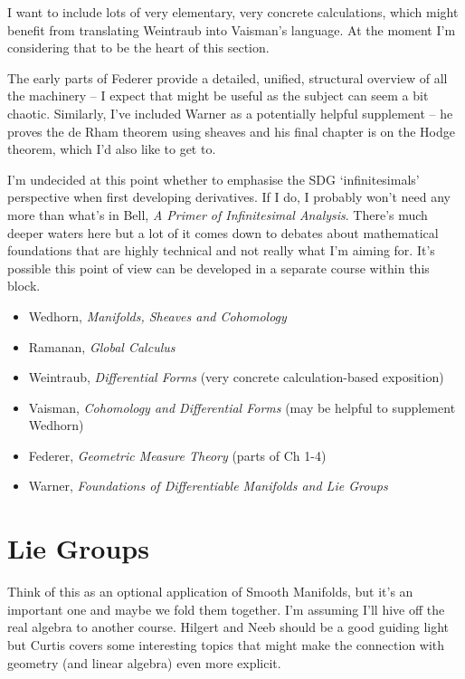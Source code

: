 \documentclass[article]{article}
\begin{document}
I want to include lots of very elementary, very concrete calculations, which might benefit from translating Weintraub into Vaisman's language. At the moment I'm considering that to be the heart of this section.

The early parts of Federer provide a detailed, unified, structural overview of all the machinery -- I expect that might be useful as the subject can seem a bit chaotic. Similarly, I've included Warner as a potentially helpful supplement -- he proves the de Rham theorem using sheaves and his final chapter is on the Hodge theorem, which I'd also like to get to.

I'm undecided at this point whether to emphasise the SDG `infinitesimals' perspective when first developing derivatives. If I do, I probably won't need any more than what's in Bell, \textit{A Primer of Infinitesimal Analysis}. There's much deeper waters here but a lot of it comes down to debates about mathematical foundations that are highly technical and not really what I'm aiming for. It's possible this point of view can be developed in a separate course within this block.

\begin{itemize}
	\item[]{Wedhorn, \textit{Manifolds, Sheaves and Cohomology}}
	\item[]{Ramanan, \textit{Global Calculus}}
	\item[]{Weintraub, \textit{Differential Forms} (very concrete calculation-based exposition)}
	\item[]{Vaisman, \textit{Cohomology and Differential Forms} (may be helpful to supplement Wedhorn)}
	\item[]{Federer, \textit{Geometric Measure Theory} (parts of Ch 1-4)}
	\item[]{Warner, \textit{Foundations of Differentiable Manifolds and Lie Groups}}
\end{itemize}

\section{Lie Groups}

Think of this as an optional application of Smooth Manifolds, but it's an important one and maybe we fold them together. I'm assuming I'll hive off the real algebra to another course. Hilgert and Neeb should be a good guiding light but Curtis covers some interesting topics that might make the connection with geometry (and linear algebra) even more explicit. 
\end{document}
